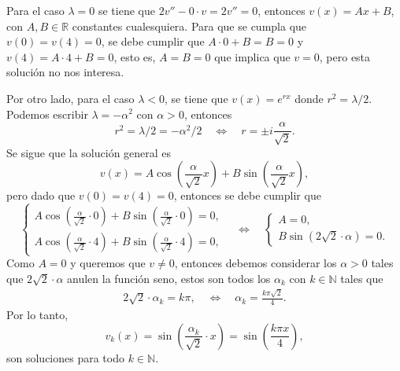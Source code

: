 \documentclass[12pt]{article}
\newcommand{\N}{\mathbb{N}}
\newcommand{\R}{\mathbb{R}}
\newcommand{\pp}[1]{\left( #1 \right)}
\newcommand{\Ssi}{\quad\Longleftrightarrow\quad}
\renewcommand{\l}{\lambda}
\renewcommand{\a}{\alpha}
\begin{document}
\begin{enumerate}
\begin{enumerate}
            Para el caso $\l=0$ se tiene que $2v''-0\cdot v = 2v'' =0$, entonces $v(x)=Ax+B$, con $A,B\in\R$ constantes cualesquiera. Para que se cumpla que $v(0)=v(4)=0$, se debe cumplir que $A\cdot0+B=B=0$ y $v(4)=A\cdot 4+B=0$, esto es, $A=B=0$ que implica que $v=0$, pero esta solución no nos interesa.

            Por otro lado, para el caso $\l<0$, se tiene que $v(x)=e^{rx}$ donde $r^2=\l/2$. Podemos escribir $\l=-\a^2$ con $\a>0$, entonces 
            \[r^2=\l/2=-\a^2/2\Ssi r=\pm i\frac{\a}{\sqrt{2}}.\]
            Se sigue que la solución general es
            \[v(x) = A\cos\pp{\frac{\a}{\sqrt{2}} x} + B\sin\pp{\frac{\a}{\sqrt{2}} x},\]
            pero dado que $v(0)=v(4)=0$, entonces se debe cumplir que
            \[
            \begin{cases}
                A\cos\pp{\frac{\a}{\sqrt{2}}\cdot 0} + B\sin\pp{\frac{\a}{\sqrt{2}}\cdot 0} = 0,\\
                A\cos\pp{\frac{\a}{\sqrt{2}}\cdot 4} + B\sin\pp{\frac{\a}{\sqrt{2}}\cdot 4} =0,
            \end{cases}
            \Ssi
            \begin{cases}
                A = 0,\\
                B\sin\pp{2\sqrt{2}\cdot\a} =0.
            \end{cases}
            \]
            Como $A=0$ y queremos que $v\neq 0$, entonces debemos considerar los $\a>0$ tales que $2\sqrt{2}\cdot \a$ anulen la función seno, estos son todos los $\a_k$ con $k\in\N$ tales que
            \begin{align*}
                2\sqrt{2}\cdot \a_k = k\pi,\Ssi \a_k=\frac{k\pi\sqrt{2}}{4}.
            \end{align*}
            Por lo tanto,
            \[ v_k(x) = \sin\pp{\frac{\a_k}{\sqrt{2}}\cdot x}= \sin\pp{\frac{k\pi x}{4}}, \]
            son soluciones para todo $k\in\N$.


\end{enumerate}
\end{enumerate}
\end{document}
